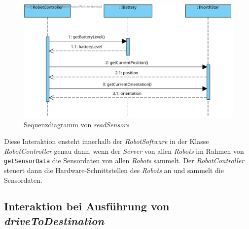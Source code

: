 \begin{figure}[H]
	\centering
	\includegraphics[width=1\textwidth]{img/8-readSensor}
	\caption{Sequenzdiagramm von \emph{readSensors}}
	\label{ReadSensorsInteraktion}
\end{figure}
Diese Interaktion ensteht innerhalb der \textit{RobotSoftware} in der Klasse \textit{RobotController} genau dann, wenn der \textit{Server} von allen \textit{Robots} im Rahmen von \texttt{getSensorData} die Sensordaten von allen  \textit{Robots} sammelt. Der \textit{RobotController} steuert dann die Hardware-Schnittstellen des \textit{Robots} an und sammelt die Sensordaten.
\\
	
\subsection*{Interaktion bei Ausführung von \textit{driveToDestination}}


